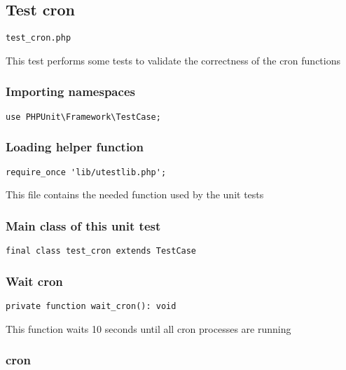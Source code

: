 \documentclass[a4paper]{article}
\begin{document}
\hypertarget{toc116}{}
\subsection{Test cron}

\begin{lstlisting}
test_cron.php
\end{lstlisting}

This test performs some tests to validate the correctness
of the cron functions

\hypertarget{toc117}{}
\subsubsection{Importing namespaces}

\begin{lstlisting}
use PHPUnit\Framework\TestCase;
\end{lstlisting}

\hypertarget{toc118}{}
\subsubsection{Loading helper function}

\begin{lstlisting}
require_once 'lib/utestlib.php';
\end{lstlisting}

This file contains the needed function used by the unit tests

\hypertarget{toc119}{}
\subsubsection{Main class of this unit test}

\begin{lstlisting}
final class test_cron extends TestCase
\end{lstlisting}

\hypertarget{toc120}{}
\subsubsection{Wait cron}

\begin{lstlisting}
private function wait_cron(): void
\end{lstlisting}

This function waits 10 seconds until all cron processes are running

\hypertarget{toc121}{}
\subsubsection{cron}
\end{document}
